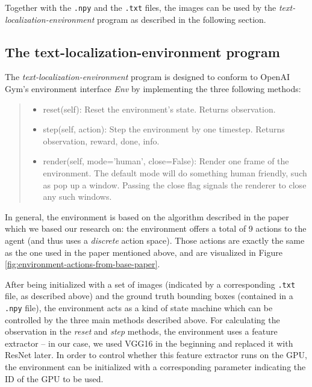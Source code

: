 \noindent Together with the \texttt{.npy} and the \texttt{.txt} files, the images can be used by the \textit{text-localization-environment} program as described in the following section.

\subsection{The text-localization-environment program}

The \textit{text-localization-environment} program is designed to conform to OpenAI Gym's environment interface \textit{Env}\cite{OpenAIGym} by implementing the three following methods:
\begin{quote}
    \begin{itemize}
        \item reset(self): Reset the environment's state. Returns observation.
        \item step(self, action): Step the environment by one timestep. Returns observation, reward, done, info.
        \item render(self, mode='human', close=False): Render one frame of the environment. The default mode will do something human friendly, such as pop up a window. Passing the close flag signals the renderer to close any such windows.
    \end{itemize}\cite{OpenAIGymReadme}
\end{quote}
In general, the environment is based on the algorithm described in the paper\cite{caicedo2015active} which we based our research on:
the environment offers a total of 9 actions to the agent (and thus uses a \textit{discrete} action space).
Those actions are exactly the same as the one used in the paper mentioned above, and are visualized in Figure \ref{fig:environment-actions-from-base-paper}.

After being initialized with a set of images (indicated by a corresponding \texttt{.txt} file, as described above) and the ground truth bounding boxes (contained in a \texttt{.npy} file), the environment acts as a kind of state machine which can be controlled by the three main methods described above. 
For calculating the observation in the \textit{reset} and \textit{step} methods, the environment uses a feature extractor – in our case, we used VGG16\cite{VGG16} in the beginning and replaced it with ResNet\cite{ResNet} later.
In order to control whether this feature extractor runs on the GPU, the environment can be initialized with a corresponding parameter indicating the ID of the GPU to be used.

